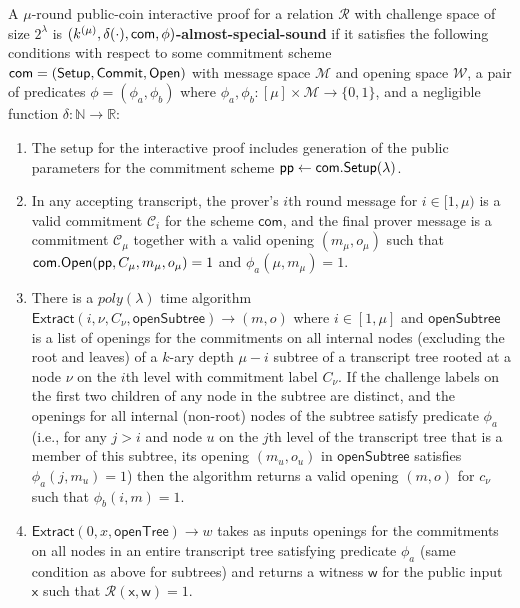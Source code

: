 \begin{definition}\label{def:darkspecialsoundness} A $\mu$-round public-coin interactive proof for a relation $\mathcal{R}$ with challenge space of size $2^\lambda$ is \textbf{$(k^{(\mu)}, \delta(\cdot), \mathsf{com}, \phi)$-almost-special-sound} if it satisfies the following conditions with respect to some commitment scheme $\mathsf{com} = (\textsf{{Setup}},\textsf{{Commit}}, \textsf{{Open}})$ with message space $\mathcal{M}$ and opening space $\mathcal{W}$, a pair of predicates $\phi = (\phi_a, \phi_b)$ where $\phi_a, \phi_b:[\mu] \times \mathcal{M}  \rightarrow \{0,1\}$, and a negligible function $\delta: \mathbb{N} \rightarrow \mathbb{R}$:

\begin{enumerate} 
\item The setup for the interactive proof includes generation of the public parameters for the commitment scheme $\textsf{pp} \gets \textsf{com}.\textsf{{Setup}}(\lambda)$.  
\item  In any accepting transcript, the prover's $i$th round message for $i \in [1,\mu)$ is a valid commitment $\mathcal{C}_i$ for the scheme $\mathsf{com}$, and the final prover message is a commitment $\mathcal{C}_\mu$ together with a valid opening $(m_\mu, o_\mu)$ such that $\textsf{com}.\textsf{{Open}}(\textsf{pp},C_\mu, m_\mu, o_\mu) = 1$ and $\phi_a(\mu, m_\mu) = 1$. 


\item  There is a $poly(\lambda)$ time algorithm $\textsf{Extract}(i, \nu, C_\nu, \textsf{openSubtree}) \rightarrow (m, o)$ where $i \in [1,\mu]$ and $\textsf{openSubtree}$ is a list of openings for the commitments on all internal nodes (excluding the root and leaves) of a $k$-ary depth $\mu - i$ subtree of a transcript tree rooted at a node $\nu$ on the $i$th level with commitment label $C_\nu$. If the challenge labels on the first two children of any node in the subtree are distinct, and the openings for all internal (non-root) nodes of the subtree satisfy predicate $\phi_a$ (i.e., for any $j > i$ and node $u$ on the $j$th level of the transcript tree that is a member of this subtree, its opening $(m_u, o_u)$ in $\textsf{openSubtree}$ satisfies $\phi_a(j, m_u)= 1$) then the algorithm returns a valid opening $(m,o)$ for $c_\nu$ such that $\phi_b(i, m) = 1$.  

\item  $\textsf{Extract}(0,x,\textsf{openTree}) \rightarrow w$ takes as inputs openings for the commitments on all nodes in an entire transcript tree satisfying predicate $\phi_a$ (same condition as above for subtrees) and returns a witness $\mathsf{w}$ for the public input $\mathsf{x}$ such that $\mathcal{R}(\mathsf{x},\mathsf{w})=1$. 


\end{enumerate}
\end{definition}
